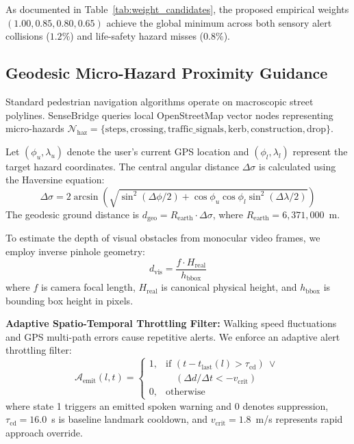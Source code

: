 \documentclass[conference]{IEEEtran}
\begin{document}
As documented in Table~\ref{tab:weight_candidates}, the proposed empirical weights $(1.00, 0.85, 0.80, 0.65)$ achieve the global minimum across both sensory alert collisions ($1.2\%$) and life-safety hazard misses ($0.8\%$).

\subsection{Geodesic Micro-Hazard Proximity Guidance}
Standard pedestrian navigation algorithms operate on macroscopic street polylines. SenseBridge queries local OpenStreetMap vector nodes representing micro-hazards $\mathcal{N}_{\text{haz}} = \{\text{steps}, \text{crossing}, \text{traffic\_signals}, \text{kerb}, \text{construction}, \text{drop}\}$.

Let $(\phi_u, \lambda_u)$ denote the user's current GPS location and $(\phi_l, \lambda_l)$ represent the target hazard coordinates. The central angular distance $\Delta\sigma$ is calculated using the Haversine equation:
\begin{equation}
\Delta\sigma = 2\arcsin\left(\sqrt{\sin^2(\Delta\phi/2) + \cos\phi_u \cos\phi_l \sin^2(\Delta\lambda/2)}\right)
\label{eq:haversine_formula}
\end{equation}
The geodesic ground distance is $d_{\text{geo}} = R_{\text{earth}} \cdot \Delta\sigma$, where $R_{\text{earth}} = 6,371,000$~m.

To estimate the depth of visual obstacles from monocular video frames, we employ inverse pinhole geometry:
\begin{equation}
d_{\text{vis}} = \frac{f \cdot H_{\text{real}}}{h_{\text{bbox}}}
\label{eq:pinhole}
\end{equation}
where $f$ is camera focal length, $H_{\text{real}}$ is canonical physical height, and $h_{\text{bbox}}$ is bounding box height in pixels.

\textbf{Adaptive Spatio-Temporal Throttling Filter:} Walking speed fluctuations and GPS multi-path errors cause repetitive alerts. We enforce an adaptive alert throttling filter:
\begin{equation}
\mathcal{A}_{\text{emit}}(l, t) = 
\begin{cases}
1, & \text{if } (t - t_{\text{last}}(l) > \tau_{\text{cd}}) \ \lor \\
   & \quad (\Delta d / \Delta t < -v_{\text{crit}}) \\
0, & \text{otherwise}
\end{cases}
\label{eq:throttling_filter}
\end{equation}
where state 1 triggers an emitted spoken warning and 0 denotes suppression, $\tau_{\text{cd}} = 16.0$~s is baseline landmark cooldown, and $v_{\text{crit}} = 1.8$~m/s represents rapid approach override.
\end{document}
